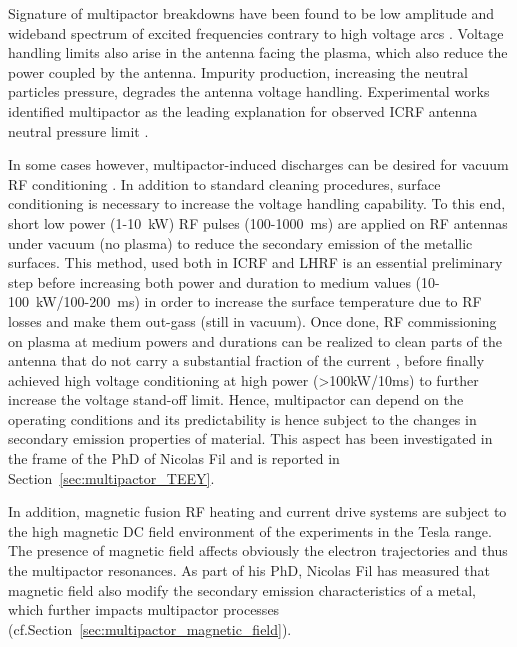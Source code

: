 
Signature of multipactor breakdowns have been found to be low amplitude and wideband spectrum of excited frequencies contrary to high voltage arcs \cite{dinca2009}. Voltage handling limits also arise in the antenna facing the plasma, which also reduce the power coupled by the antenna. Impurity production, increasing the neutral particles pressure, degrades the antenna voltage handling. Experimental works identified multipactor as the leading explanation for observed ICRF antenna neutral pressure limit \cite{graves2006}.

In some cases however, multipactor-induced discharges can be desired for vacuum RF conditioning . In addition to standard cleaning procedures, surface conditioning is necessary to increase the voltage handling capability. To this end, short low power (1-10~kW) RF pulses (100-1000~ms) are applied on RF antennas under vacuum (no plasma) to reduce the secondary emission of the metallic surfaces. This method, used both in ICRF  and LHRF  is an essential preliminary step before increasing both power and duration to medium values (10-100~kW/100-200~ms) in order to increase the surface temperature due to RF losses and make them out-gass (still in vacuum). Once done, RF commissioning on plasma at medium powers and durations can be realized to clean parts of the antenna that do not carry a substantial fraction of the current , before finally achieved high voltage conditioning at high power (>100kW/10ms) to further increase the voltage stand-off limit. Hence, multipactor can depend on the operating conditions and its predictability is hence subject to the changes  in secondary emission properties of material. This aspect has been investigated in the frame of the PhD of Nicolas Fil and is reported in Section~\ref{sec:multipactor_TEEY}.

In addition, magnetic fusion RF heating and current drive systems are subject to the high magnetic DC field environment of the experiments in the Tesla range. The presence of magnetic field affects obviously the electron trajectories and thus the multipactor resonances. As part of his PhD, Nicolas Fil  has measured that magnetic field also modify the secondary emission characteristics of a metal, which further impacts multipactor processes (cf.Section~\ref{sec:multipactor_magnetic_field}). 

